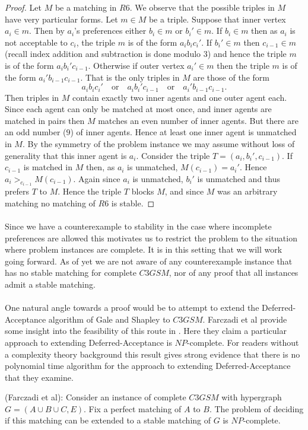 \begin{proof}
Let $M$ be a matching in $R6$. We observe that the possible triples in $M$ have very particular forms. Let $m \in M$ be a triple. Suppose that inner vertex $a_i \in m$. Then by $a_i$'s preferences either $b_i \in m$ or $b_i' \in m$. If $b_i \in m$ then as $a_i$ is not acceptable to $c_i$, the triple $m$ is of the form $a_ib_ic_i'$. If $b_i' \in m$ then $c_{i-1} \in m$ (recall index addition and subtraction is done modulo $3$) and hence the triple $m$ is of the form $a_i b_i'c_{i-1}$. Otherwise if outer vertex $a_i' \in m$ then the triple $m$ is of the form $a_i'b_{i-1}c_{i-1}$. That is the only triples in $M$ are those of the form
$$a_ib_ic_i' \quad\text{or}\quad a_ib_i'c_{i-1} \quad\text{or}\quad a_i'b_{i-1}c_{i-1}.$$
Then triples in $M$ contain exactly two inner agents and one outer agent each. Since each agent can only be matched at most once, and inner agents are matched in pairs then $M$ matches an even number of inner agents. But there are an odd number ($9$) of inner agents. Hence at least one inner agent is unmatched in $M$. By the symmetry of the problem instance we may assume without loss of generality that this inner agent is $a_i$. Consider the triple $T=(a_i, b_{i}', c_{i-1})$. If $c_{i-1}$ is matched in $M$ then, as $a_i$ is unmatched, $M(c_{i-1}) = a_i'$. Hence $a_i >_{c_{i-1}} M(c_{i-1})$. Again since $a_i$ is unmatched, $b_{i}'$ is unmatched and thus prefers $T$ to $M$. Hence the triple $T$ blocks $M$, and since $M$ was an arbitrary matching no matching of $R6$ is stable.
\end{proof}
\paragraph{}
Since we have a counterexample to stability in the case where incomplete preferences are allowed this motivates us to restrict the problem to the situation where problem instances are complete. It is in this setting that we will work going forward. As of yet we are not aware of any counterexample instance that has no stable matching for complete $C3GSM$, nor of any proof that all instances admit a stable matching.
\paragraph{}
One natural angle towards a proof would be to attempt to extend the Deferred-Acceptance algorithm of Gale and Shapley to $C3GSM$. Farczadi et al provide some insight into the feasibility of this route in \cite{farczadi2014stable}. Here they claim a particular approach to extending Deferred-Acceptance is $NP$-complete. For readers without a complexity theory background this result gives strong evidence that there is no polynomial time algorithm for the approach to extending Deferred-Acceptance that they examine.
\begin{theorem}
(Farczadi et al): Consider an instance of complete $C3GSM$ with hypergraph $G=(A\cup B\cup C, E)$. Fix a perfect matching of $A$ to $B$. The problem of deciding if this matching can be extended to a stable matching of $G$ is $NP$-complete.
\end{theorem}
